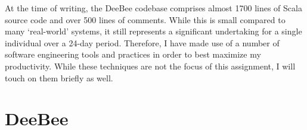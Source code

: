 At the time of writing, the DeeBee codebase comprises almost 1700 lines of Scala source code and over 500 lines of comments. While this is small compared to many `real-world' systems, it still represents a significant undertaking for a single individual over a 24-day period. Therefore, I have made use of a number of software engineering tools and practices in order to best maximize my productivity. While these techniques are not the focus of this assignment, I will touch on them briefly as well.

\section{DeeBee}


\pagebreak
{}


